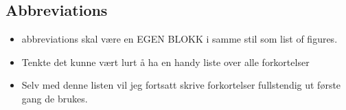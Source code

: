 \subsection{Abbreviations}
\begin{itemize}
    \item abbreviations skal være en EGEN BLOKK i samme stil som list of figures.
    \item Tenkte det kunne vært lurt å ha en handy liste over alle forkortelser
    \item Selv med denne listen vil jeg fortsatt skrive forkortelser fullstendig ut første gang de brukes.
\end{itemize}

\newpage
